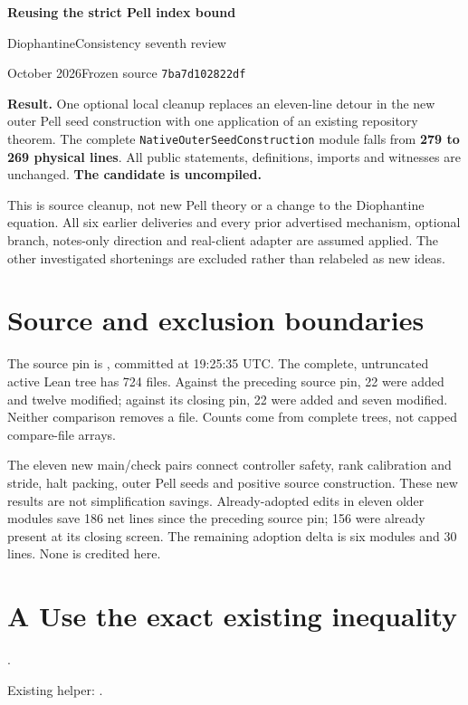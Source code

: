 

\begin{center}
{\LARGE\bfseries Reusing the strict Pell index bound}\par\medskip
{\large DiophantineConsistency seventh review}\par{} October 2026\quad Frozen source \texttt{7ba7d102822df}
\end{center}

\textbf{Result.} One optional local cleanup replaces an eleven-line detour in the new outer Pell seed construction with one application of an existing repository theorem. The complete \texttt{NativeOuterSeedConstruction} module falls from \textbf{279 to 269 physical lines}. All public statements, definitions, imports and witnesses are unchanged. \textbf{The candidate is uncompiled.}

This is source cleanup, not new Pell theory or a change to the Diophantine equation. All six earlier deliveries and every prior advertised mechanism, optional branch, notes-only direction and real-client adapter are assumed applied. The other investigated shortenings are excluded rather than relabeled as new ideas.

\section{Source and exclusion boundaries}
The source pin is \texttt{\commit}, committed at 19:25:35 UTC. The complete, untruncated active Lean tree has 724 files. Against the preceding source pin, 22 were added and twelve modified; against its closing pin, 22 were added and seven modified. Neither comparison removes a file. Counts come from complete trees, not capped compare-file arrays.

The eleven new main/check pairs connect controller safety, rank calibration and stride, halt packing, outer Pell seeds and positive source construction. These new results are not simplification savings. Already-adopted edits in eleven older modules save 186 net lines since the preceding source pin; 156 were already present at its closing screen. The remaining adoption delta is six modules and 30 lines. None is credited here.



\section{A Use the exact existing inequality}
 . \par Existing helper:
.

